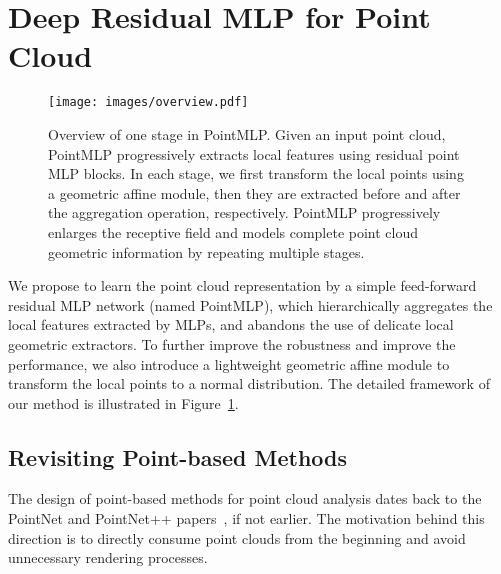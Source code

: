 \section{Deep Residual MLP for Point Cloud}
\label{sec:pointmlp}

\begin{figure}
    \centering
    \texttt{[image: images/overview.pdf]}
    \caption{Overview of one stage in PointMLP. Given an input point cloud, PointMLP progressively extracts local features using residual point MLP blocks. In each stage, we first transform the local points using a geometric affine module, then they are extracted before and after the aggregation operation, respectively. PointMLP progressively enlarges the receptive field and models complete point cloud geometric information by repeating multiple stages.}
    \label{fig:architecture}
\end{figure}

We propose to learn the point cloud representation by a simple feed-forward residual MLP network (named PointMLP), which hierarchically aggregates the local features extracted by MLPs, and abandons the use of delicate local geometric extractors. To further improve the robustness and improve the performance, we also introduce a lightweight geometric affine module to transform the local points to a normal distribution. The detailed framework of our method is illustrated in Figure~\ref{fig:architecture}.

\subsection{Revisiting Point-based Methods}
The design of point-based methods for point cloud analysis dates back to the PointNet and PointNet++ papers~\citep{qi2017pointnet, qi2017pointnet++}, if not earlier. The motivation behind this direction is to directly consume point clouds from the beginning and avoid unnecessary rendering processes.  

